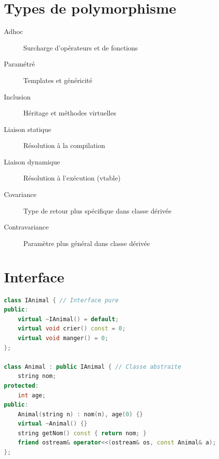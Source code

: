 \documentclass[9pt]{extarticle}
\begin{document}
\begin{multicols*}{3}
\section*{Types de polymorphisme}
\begin{description}
\item[Adhoc] Surcharge d'opérateurs et de fonctions
\item[Paramétré] Templates et généricité
\item[Inclusion] Héritage et méthodes virtuelles
\item[Liaison statique] Résolution à la compilation
\item[Liaison dynamique] Résolution à l'exécution (vtable)
\item[Covariance] Type de retour plus spécifique dans classe dérivée
\item[Contravariance] Paramètre plus général dans classe dérivée
\end{description}

\section*{Interface}
\begin{lstlisting}[language=C++]
class IAnimal { // Interface pure
public:
    virtual ~IAnimal() = default;
    virtual void crier() const = 0;
    virtual void manger() = 0;
};

class Animal : public IAnimal { // Classe abstraite
    string nom;
protected:
    int age;
public:
    Animal(string n) : nom(n), age(0) {}
    virtual ~Animal() {}
    string getNom() const { return nom; }
    friend ostream& operator<<(ostream& os, const Animal& a);
};
\end{lstlisting}



\end{multicols*}
\end{document}

